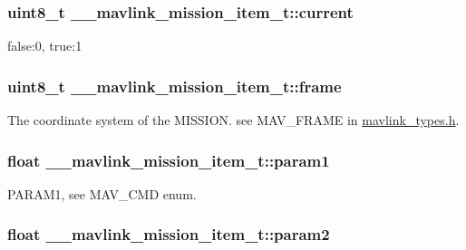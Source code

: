 \hypertarget{struct____mavlink__mission__item__t_aa9fdaa647214fcb6bb21e05f2718f56f}{
\subsubsection[{current}]{\setlength{\rightskip}{0pt plus 5cm}uint8\+\_\+t \+\_\+\+\_\+mavlink\+\_\+mission\+\_\+item\+\_\+t\+::current}}\label{struct____mavlink__mission__item__t_aa9fdaa647214fcb6bb21e05f2718f56f}


false\+:0, true\+:1 

\hypertarget{struct____mavlink__mission__item__t_aa3b25a65ef4d62f208ea6d3856b418cb}{
\subsubsection[{frame}]{\setlength{\rightskip}{0pt plus 5cm}uint8\+\_\+t \+\_\+\+\_\+mavlink\+\_\+mission\+\_\+item\+\_\+t\+::frame}}\label{struct____mavlink__mission__item__t_aa3b25a65ef4d62f208ea6d3856b418cb}


The coordinate system of the M\+I\+S\+S\+I\+O\+N. see M\+A\+V\+\_\+\+F\+R\+A\+M\+E in \hyperlink{mavlink__types_8h}{mavlink\+\_\+types.\+h}. 

\hypertarget{struct____mavlink__mission__item__t_a7b622b789be829088a8c9353946a4f28}{
\subsubsection[{param1}]{\setlength{\rightskip}{0pt plus 5cm}float \+\_\+\+\_\+mavlink\+\_\+mission\+\_\+item\+\_\+t\+::param1}}\label{struct____mavlink__mission__item__t_a7b622b789be829088a8c9353946a4f28}


P\+A\+R\+A\+M1, see M\+A\+V\+\_\+\+C\+M\+D enum. 

\hypertarget{struct____mavlink__mission__item__t_ad523243067b6c47919554e8802f14b5c}{
\subsubsection[{param2}]{\setlength{\rightskip}{0pt plus 5cm}float \+\_\+\+\_\+mavlink\+\_\+mission\+\_\+item\+\_\+t\+::param2}}\label{struct____mavlink__mission__item__t_ad523243067b6c47919554e8802f14b5c}


